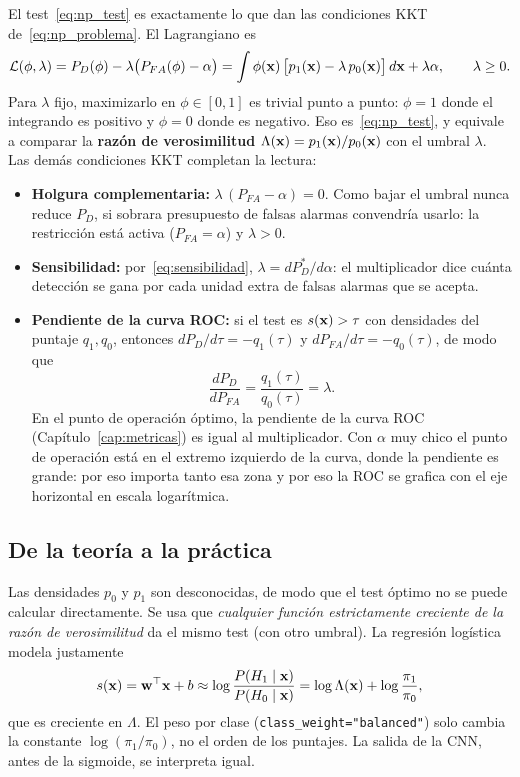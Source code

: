 El test~\eqref{eq:np_test} es exactamente lo que dan las condiciones KKT de~\eqref{eq:np_problema}. El Lagrangiano es
\begin{equation}
  \mathcal{L}(\phi, \lambda) = P_D(\phi) - \lambda\big(P_{FA}(\phi) - \alpha\big)
  = \int\phi(\mathbf{x})\,\big[p_1(\mathbf{x}) - \lambda\,p_0(\mathbf{x})\big]\,d\mathbf{x} + \lambda\alpha,
  \qquad \lambda \ge 0.
\end{equation}
Para $\lambda$ fijo, maximizarlo en $\phi \in [0,1]$ es trivial punto a punto: $\phi = 1$ donde el integrando es
positivo y $\phi = 0$ donde es negativo. Eso es~\eqref{eq:np_test}, y equivale a comparar la \textbf{razón de
verosimilitud} $\Lambda(\mathbf{x}) = p_1(\mathbf{x})/p_0(\mathbf{x})$ con el umbral $\lambda$. Las demás condiciones KKT completan la
lectura:
\begin{itemize}
  \item \textbf{Holgura complementaria:} $\lambda\,(P_{FA} - \alpha) = 0$. Como bajar el umbral nunca reduce $P_D$, si
        sobrara presupuesto de falsas alarmas convendría usarlo: la restricción está activa ($P_{FA} = \alpha$) y
        $\lambda > 0$.
  \item \textbf{Sensibilidad:} por~\eqref{eq:sensibilidad}, $\lambda = dP_D^*/d\alpha$: el multiplicador dice cuánta
        detección se gana por cada unidad extra de falsas alarmas que se acepta.
  \item \textbf{Pendiente de la curva ROC:} si el test es $s(\mathbf{x}) > \tau$ con densidades del puntaje $q_1, q_0$, entonces
        $dP_D/d\tau = -q_1(\tau)$ y $dP_{FA}/d\tau = -q_0(\tau)$, de modo que
        \begin{equation}
          \frac{dP_D}{dP_{FA}} = \frac{q_1(\tau)}{q_0(\tau)} = \lambda.
          \label{eq:pendiente_roc}
        \end{equation}
        En el punto de operación óptimo, la pendiente de la curva ROC (Capítulo~\ref{cap:metricas}) es igual al
        multiplicador. Con $\alpha$ muy chico el punto de operación está en el extremo izquierdo de la curva, donde la
        pendiente es grande: por eso importa tanto esa zona y por eso la ROC se grafica con el eje horizontal en
        escala logarítmica.
\end{itemize}

\subsection{De la teoría a la práctica}

Las densidades $p_0$ y $p_1$ son desconocidas, de modo que el test óptimo no se puede calcular directamente. Se usa
que \emph{cualquier función estrictamente creciente de la razón de verosimilitud} da el mismo test (con otro umbral).
La regresión logística modela justamente
\begin{equation}
  s(\mathbf{x}) = \mathbf{w}^\top\mathbf{x} + b \approx \log\frac{P(H_1\mid\mathbf{x})}{P(H_0\mid\mathbf{x})} = \log\Lambda(\mathbf{x}) + \log\frac{\pi_1}{\pi_0},
\end{equation}
que es creciente en $\Lambda$. El peso por clase (\texttt{class\_weight="balanced"}) solo cambia la constante
$\log(\pi_1/\pi_0)$, no el orden de los puntajes. La salida de la CNN, antes de la sigmoide, se interpreta igual.

